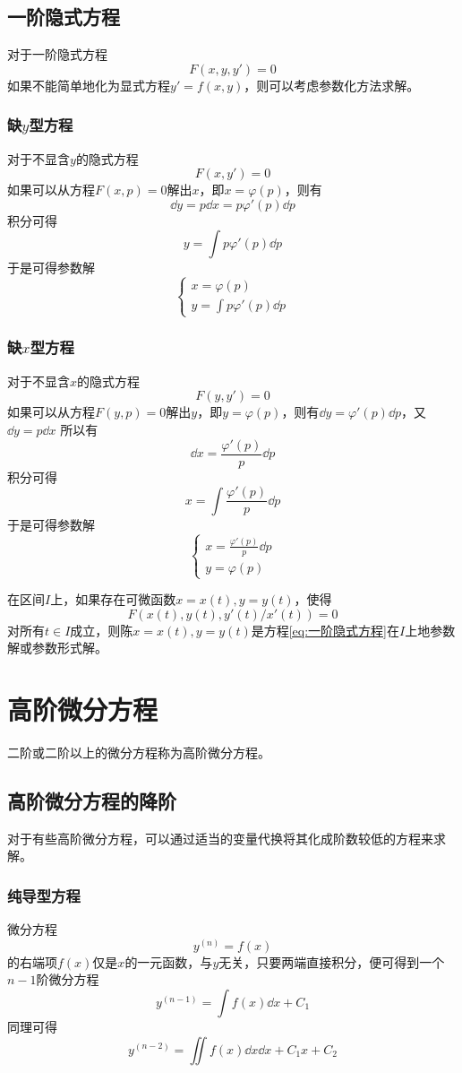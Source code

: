 \subsection{一阶隐式方程}
对于一阶隐式方程
\begin{equation*}
    \label{eq:一阶隐式方程}
    F(x,y,y') = 0
\end{equation*}
如果不能简单地化为显式方程$y'=f(x,y)$，则可以考虑参数化方法求解。
\subsubsection{缺\texorpdfstring{$y$}{y}型方程}
对于不显含$y$的隐式方程
\[ F(x,y') = 0 \]
如果可以从方程$F(x,p)=0$解出$x$，即$x=\varphi(p)$，则有
\[ \dd{y} = p\dd{x} = p\varphi'(p)\dd{p} \]
积分可得
\[ y = \int p\varphi'(p)\dd{p} \]
于是可得参数解
\[
    \begin{cases}
        x = \varphi(p) \\
        y = \int p\varphi'(p)\dd{p}
    \end{cases}
\]

\subsubsection{缺\texorpdfstring{$x$}{x}型方程}
对于不显含$x$的隐式方程
\[ F(y,y') = 0 \]
如果可以从方程$F(y,p)=0$解出$y$，即$y=\varphi(p)$，则有$\dd{y} = \varphi'(p)\dd{p}$，又$\dd{y}=p\dd{x}$
所以有
\[ \dd{x} = \frac{\varphi'(p)}{p}\dd{p} \]
积分可得
\[ x = \int \frac{\varphi'(p)}{p}\dd{p} \]
于是可得参数解
\[
    \begin{cases}
        x = \frac{\varphi'(p)}{p}\dd{p} \\
        y = \varphi(p)
    \end{cases}
\]

在区间$I$上，如果存在可微函数$x=x(t),y=y(t)$，使得
\[ F(x(t),y(t),y'(t)/x'(t)) = 0 \]
对所有$t\in I$成立，则陈$x=x(t),y=y(t)$是方程\ref{eq:一阶隐式方程}在$I$上地参数解或参数形式解。

\section{高阶微分方程}
二阶或二阶以上的微分方程称为高阶微分方程。

\subsection{高阶微分方程的降阶}
对于有些高阶微分方程，可以通过适当的变量代换将其化成阶数较低的方程来求解。
\subsubsection{纯导型方程}
微分方程\[ y^{(n)} = f(x) \]
的右端项$f(x)$仅是$x$的一元函数，与$y$无关，只要两端直接积分，便可得到一个$n-1$阶微分方程
\[ y^{(n-1)} = \int f(x)\dd{x} + C_1 \]
同理可得
\[ y^{(n-2)} = \iint f(x)\dd{x} \dd{x} +C_1x + C_2 \]

